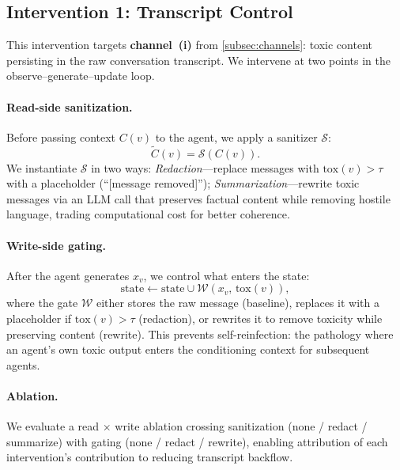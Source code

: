 \subsection{Intervention 1: Transcript Control}
\label{subsec:transcript_control}

This intervention targets \textbf{channel~(i)} from \cref{subsec:channels}: toxic content persisting in the raw conversation transcript.
We intervene at two points in the observe--generate--update loop.

\paragraph{Read-side sanitization.}
Before passing context $C(v)$ to the agent, we apply a sanitizer $\mathcal{S}$:
\begin{equation}
    \widetilde{C}(v) = \mathcal{S}\!\left(C(v)\right).
    \label{eq:read_sanitize}
\end{equation}
We instantiate $\mathcal{S}$ in two ways:
\emph{Redaction}---replace messages with $\mathrm{tox}(v) > \tau$ with a placeholder (``[message removed]'');
\emph{Summarization}---rewrite toxic messages via an LLM call that preserves factual content while removing hostile language, trading computational cost for better coherence.

\paragraph{Write-side gating.}
After the agent generates $x_v$, we control what enters the state:
\begin{equation}
    \mathrm{state} \leftarrow \mathrm{state} \cup \mathcal{W}(x_v,\, \mathrm{tox}(v)),
    \label{eq:write_gate}
\end{equation}
where the gate $\mathcal{W}$ either stores the raw message (baseline), replaces it with a placeholder if $\mathrm{tox}(v) > \tau$ (redaction), or rewrites it to remove toxicity while preserving content (rewrite).
This prevents self-reinfection: the pathology where an agent's own toxic output enters the conditioning context for subsequent agents.

\paragraph{Ablation.}
We evaluate a read $\times$ write ablation crossing sanitization (none / redact / summarize) with gating (none / redact / rewrite), enabling attribution of each intervention's contribution to reducing transcript backflow.

